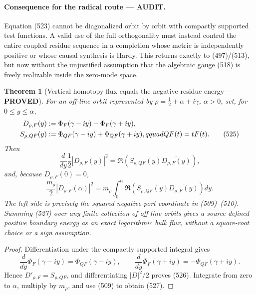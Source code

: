 \documentclass[11pt]{article}
\newtheorem{theorem}{Theorem}
\newcommand{\PROVED}{\textcolor{green!45!black}{\textbf{PROVED}}}
\newcommand{\AUDIT}{\textcolor{orange!75!black}{\textbf{AUDIT}}}
\begin{document}
\paragraph{Consequence for the radical route --- \AUDIT.}
Equation (523) cannot be diagonalized orbit by orbit with compactly
supported test functions.  A valid use of the full orthogonality must
instead control the entire coupled residue sequence in a completion whose
metric is independently positive or whose causal synthesis is Hardy.  This
returns exactly to (497)/(513), but now without the unjustified assumption
that the algebraic gauge (518) is freely realizable inside the zero-mode
space.

\begin{theorem}[Vertical homotopy flux equals the negative residue energy
--- \PROVED]
For an off-line orbit represented by
\(\rho=\frac12+\alpha+i\gamma\), \(\alpha>0\), set, for
\(0\le y\le\alpha\),
\begin{align}
 D_{\rho,F}(y)&:=\Phi_F(\gamma-iy)-\Phi_F(\gamma+iy),\notag\\
 S_{\rho,QF}(y)&:=\Phi_{QF}(\gamma-iy)+
                         \Phi_{QF}(\gamma+iy),qquad QF(t)=tF(t). \tag{525}
\end{align}
Then
\begin{equation}
 \frac{d}{dy}\frac12|D_{\rho,F}(y)|^2
 =\Re\!\left(S_{\rho,QF}(y)
              \overline{D_{\rho,F}(y)}\right),              \tag{526}
\end{equation}
and, because \(D_{\rho,F}(0)=0\),
\begin{equation}
 \boxed{
 \frac{m_\rho}{2}|D_{\rho,F}(\alpha)|^2
 =m_\rho\int_0^\alpha
   \Re\!\left(S_{\rho,QF}(y)
              \overline{D_{\rho,F}(y)}\right)dy.}           \tag{527}
\end{equation}
The left side is precisely the squared negative-port coordinate in
(509)--(510).  Summing (527) over any finite collection of off-line orbits
gives a source-defined positive boundary energy as an exact logarithmic
bulk flux, without a square-root choice or a sign assumption.
\end{theorem}

\begin{proof}
Differentiation under the compactly supported integral gives
\[
 \frac d{dy}\Phi_F(\gamma-iy)=\Phi_{QF}(\gamma-iy),\qquad
 \frac d{dy}\Phi_F(\gamma+iy)=-\Phi_{QF}(\gamma+iy).
\]
Hence \(D'_{\rho,F}=S_{\rho,QF}\), and differentiating
\(|D|^2/2\) proves (526).  Integrate from zero to \(\alpha\), multiply by
\(m_\rho\), and use (509) to obtain (527).
\end{proof}
\end{document}
